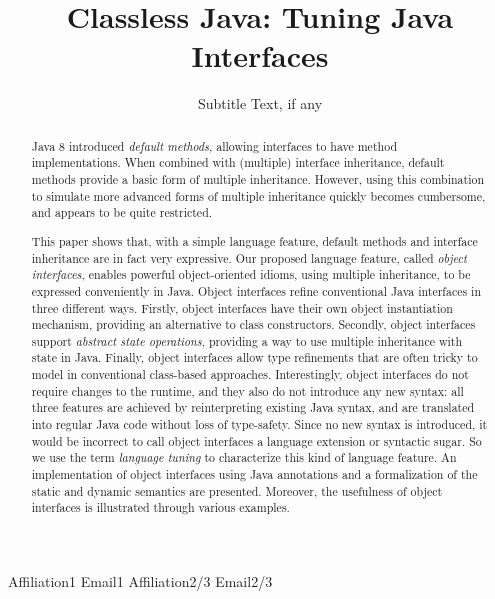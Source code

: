 \documentclass[10pt,preprint]{sigplanconf}
\begin{document}
\setlength{\pdfpageheight}{\paperheight}
\setlength{\pdfpagewidth}{\paperwidth}




\title{Classless Java: Tuning Java Interfaces}
\subtitle{Subtitle Text, if any}

           {Affiliation1}
           {Email1}
           {Affiliation2/3}
           {Email2/3}

\maketitle

\begin{abstract}
Java 8 introduced \emph{default methods}, allowing interfaces to have method
  implementations. When combined with (multiple) interface inheritance, default
  methods provide a basic form of multiple inheritance. However, using this
  combination to simulate more advanced forms of multiple inheritance quickly becomes cumbersome, and
  appears to be quite restricted.

  This paper shows that, with a simple language feature, default methods and
  interface inheritance are in fact very expressive. Our proposed language
  feature, called \emph{object interfaces}, enables powerful object-oriented
  idioms, using multiple inheritance, to be expressed conveniently in
  Java. Object interfaces refine conventional Java interfaces in three different
  ways. Firstly, object interfaces have their own object instantiation
  mechanism, providing an alternative to class constructors. Secondly, object
  interfaces support \emph{abstract state operations}, providing a way to use
  multiple inheritance with state in Java. Finally, object interfaces allow type
  refinements that are often tricky to model in conventional class-based
  approaches. Interestingly, object interfaces do not require changes to the
  runtime, and they also do not introduce any new syntax: all three features are
  achieved by reinterpreting existing Java syntax, and are translated into
  regular Java code without loss of type-safety. Since no new syntax is
  introduced, it would be incorrect to call object interfaces a language
  extension or syntactic sugar. So we use the term \emph{language tuning} to
  characterize this kind of language feature. An implementation of object
  interfaces using Java annotations and a formalization of the static and
  dynamic semantics are presented. Moreover, the usefulness of object interfaces
  is illustrated through various examples.
\end{abstract}
\end{document}
